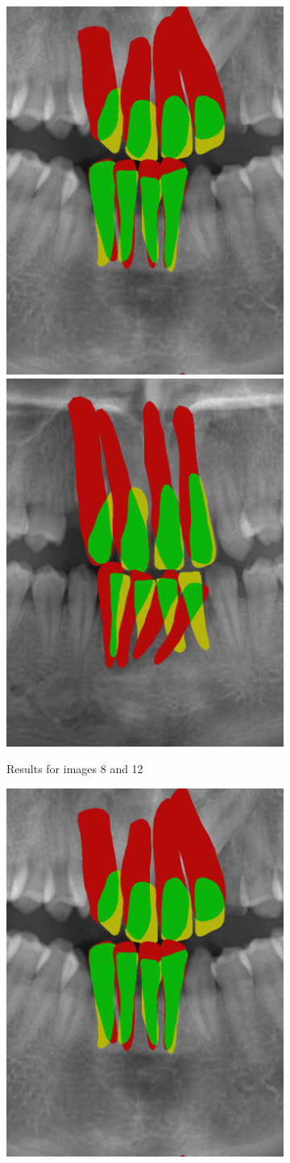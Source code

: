 \documentclass[a4paper,titlepage,12pt]{article}
\begin{document}
\begin{figure}
	\begin{subfigure}{0.48\linewidth}
		\centering
		\includegraphics[width=0.48\columnwidth]{results/8i50}
		\includegraphics[width=0.48\columnwidth]{results/12i50}
		\caption{Results for images 8 and 12}
	\end{subfigure}
	\begin{subfigure}{0.48\linewidth}
		\centering
		\includegraphics[width=0.48\columnwidth]{results/8i50}

\end{subfigure}
\end{figure}
\end{document}
